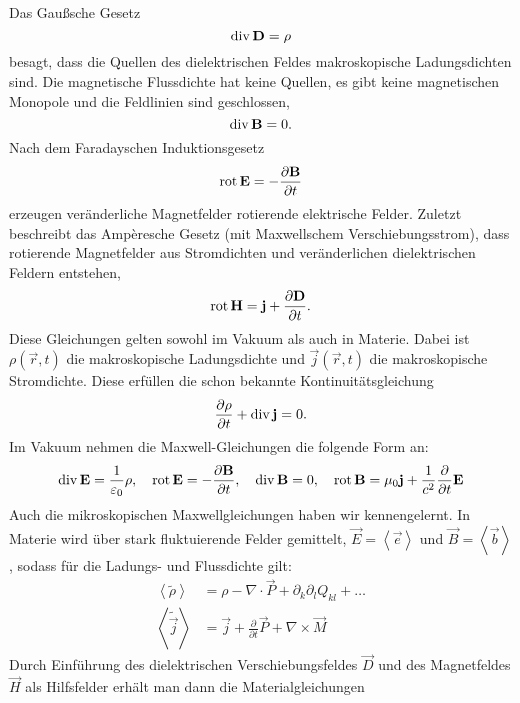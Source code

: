 Das Gaußsche Gesetz
\begin{equation*}
	\operatorname{div} \mathbf{D}=\rho
\end{equation*}
besagt, dass die Quellen des dielektrischen Feldes makroskopische Ladungsdichten sind. Die magnetische Flussdichte hat keine Quellen, es gibt keine magnetischen Monopole und die Feldlinien sind geschlossen,
\begin{equation*}
	\operatorname{div} \mathbf{B}=0.
\end{equation*}
Nach dem Faradayschen Induktionsgesetz
\begin{equation*}
	\operatorname{rot} \mathbf{E}=-\frac{\partial \mathbf{B}}{\partial t}
\end{equation*}
erzeugen veränderliche Magnetfelder rotierende elektrische Felder. Zuletzt beschreibt das Ampèresche Gesetz (mit Maxwellschem Verschiebungsstrom), dass rotierende Magnetfelder aus Stromdichten und veränderlichen dielektrischen Feldern entstehen,
\begin{equation*}
	\operatorname{rot} \mathbf{H}=\mathbf{j}+\frac{\partial \mathbf{D}}{\partial t}.
\end{equation*}
Diese Gleichungen gelten sowohl im Vakuum als auch in Materie. Dabei ist $\rho \left(\vec {r},t\right)$ die makroskopische Ladungsdichte und $\vec {j}\left(\vec {r},t\right)$ die makroskopische Stromdichte. Diese erfüllen die schon bekannte Kontinuitätsgleichung
\begin{equation*}
	\frac{\partial \rho }{\partial t}+\operatorname{div} \mathbf{j}=0.
\end{equation*}
Im Vakuum nehmen die Maxwell-Gleichungen die folgende Form an:
\begin{equation*}
	\operatorname{div} \mathbf{E}=\frac{1}{\varepsilon _{0}}\rho ,\quad \operatorname{rot} \mathbf{E}=-\frac{\partial \mathbf{B}}{\partial t},\quad \operatorname{div} \mathbf{B}=0,\quad \operatorname{rot} \mathbf{B}=\mu _{0}\mathbf{j}+\frac{1}{c^{2}}\frac{\partial }{\partial t}\mathbf{E}
\end{equation*}
Auch die mikroskopischen Maxwellgleichungen haben wir kennengelernt. In Materie wird über stark fluktuierende Felder gemittelt, $\vec {E}=\left\langle \vec {e}\right\rangle $ und $\vec {B}=\left\langle \vec {b}\right\rangle $, sodass für die Ladungs- und Flussdichte gilt:
\begin{align*}
	\left\langle \tilde{\rho }\right\rangle &=\rho -\nabla \cdot \vec {P}+\partial _{k}\partial _{l}Q_{kl}+\ldots \\
	\left\langle \tilde{\vec {j}}\right\rangle &=\vec {j}+\frac{\partial }{\partial t}\vec {P}+\nabla \times \vec {M}
\end{align*}
Durch Einführung des dielektrischen Verschiebungsfeldes $\vec {D}$ und des Magnetfeldes $\vec {H}$ als Hilfsfelder erhält man dann die Materialgleichungen
